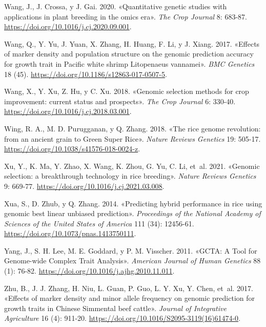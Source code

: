 \documentclass[11pt,spanish,a4paper,oneside,]{book} %
\begin{document}
\leavevmode\hypertarget{ref-cite:46}{}%
Wang, J., J. Crossa, y J. Gai. 2020. «Quantitative genetic studies with applications in plant breeding in the omics era». \emph{The Crop Journal} 8: 683-87. \url{https://doi.org/10.1016/j.cj.2020.09.001}.

\leavevmode\hypertarget{ref-cite:82}{}%
Wang, Q., Y. Yu, J. Yuan, X. Zhang, H. Huang, F. Li, y J. Xiang. 2017. «Effects of marker density and population structure on the genomic prediction accuracy for growth trait in Pacific white shrimp Litopenaeus vannamei». \emph{BMC Genetics} 18 (45). \url{https://doi.org/10.1186/s12863-017-0507-5}.

\leavevmode\hypertarget{ref-cite:77}{}%
Wang, X., Y. Xu, Z. Hu, y C. Xu. 2018. «Genomic selection methods for crop improvement: current status and prospects». \emph{The Crop Journal} 6: 330-40. \url{https://doi.org/10.1016/j.cj.2018.03.001}.

\leavevmode\hypertarget{ref-cite:55}{}%
Wing, R. A., M. D. Purugganan, y Q. Zhang. 2018. «The rice genome revolution: from an ancient grain to Green Super Rice». \emph{Nature Reviews Genetics} 19: 505-17. \url{https://doi.org/10.1038/s41576-018-0024-z}.

\leavevmode\hypertarget{ref-cite:60}{}%
Xu, Y., K. Ma, Y. Zhao, X. Wang, K. Zhou, G. Yu, C. Li, et~al. 2021. «Genomic selection: a breakthrough technology in rice breeding». \emph{Nature Reviews Genetics} 9: 669-77. \url{https://doi.org/10.1016/j.cj.2021.03.008}.

\leavevmode\hypertarget{ref-cite:25}{}%
Xua, S., D. Zhub, y Q. Zhang. 2014. «Predicting hybrid performance in rice using genomic best linear unbiased prediction». \emph{Proceedings of the National Academy of Sciences of the United States of America} 111 (34): 12456-61. \url{https://doi.org/10.1073/pnas.1413750111}.

\leavevmode\hypertarget{ref-cite:54}{}%
Yang, J., S. H. Lee, M. E. Goddard, y P. M. Visscher. 2011. «GCTA: A Tool for Genome-wide Complex Trait Analysis». \emph{American Journal of Human Genetics} 88 (1): 76-82. \url{https://doi.org/10.1016/j.ajhg.2010.11.011}.

\leavevmode\hypertarget{ref-cite:83}{}%
Zhu, B., J. J. Zhang, H. Niu, L. Guan, P. Guo, L. Y. Xu, Y. Chen, et~al. 2017. «Effects of marker density and minor allele frequency on genomic prediction for growth traits in Chinese Simmental beef cattle». \emph{Journal of Integrative Agriculture} 16 (4): 911-20. \url{https://doi.org/10.1016/S2095-3119(16)61474-0}.
\end{document}
